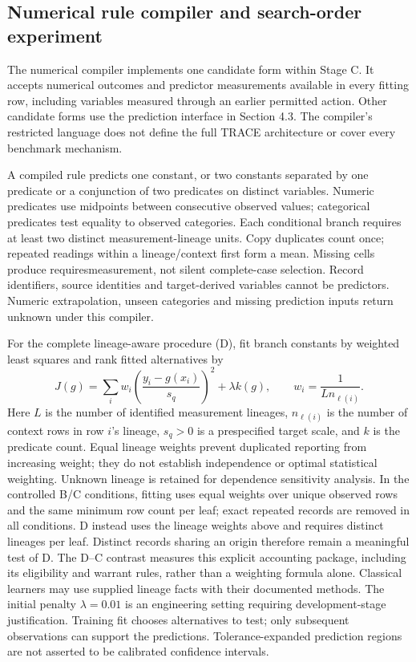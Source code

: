 \documentclass[11pt,a4paper]{article}
\newcommand{\CNSIdentifier}[1]{{\small\ttfamily\def\_{\textunderscore\allowbreak}#1}}
\begin{document}
\subsection{Numerical rule compiler and search-order
experiment}\label{numerical-rule-compiler-and-search-order-experiment}

The numerical compiler implements one candidate form within Stage C. It
accepts numerical outcomes and predictor measurements available in every
fitting row, including variables measured through an earlier permitted
action. Other candidate forms use the prediction interface in Section
4.3. The compiler's restricted language does not define the full TRACE
architecture or cover every benchmark mechanism.

A compiled rule predicts one constant, or two constants separated by one
predicate or a conjunction of two predicates on distinct variables.
Numeric predicates use midpoints between consecutive observed values;
categorical predicates test equality to observed categories. Each
conditional branch requires at least two distinct measurement-lineage
units. Copy duplicates count once; repeated readings within a
lineage/context first form a mean. Missing cells produce
\CNSIdentifier{requires\_measurement}, not silent complete-case selection.
Record identifiers, source identities and target-derived variables
cannot be predictors. Numeric extrapolation, unseen categories and
missing prediction inputs return unknown under this compiler.

For the complete lineage-aware procedure (D), fit branch constants by
weighted least squares and rank fitted alternatives by \[
J(g)=\sum_i w_i\left(\frac{y_i-g(x_i)}{s_q}\right)^2+\lambda k(g),\qquad
w_i=\frac{1}{L n_{\ell(i)}}.
\] Here \(L\) is the number of identified measurement lineages,
\(n_{\ell(i)}\) is the number of context rows in row \(i\)'s lineage,
\(s_q>0\) is a prespecified target scale, and \(k\) is the predicate
count. Equal lineage weights prevent duplicated reporting from
increasing weight; they do not establish independence or optimal
statistical weighting. Unknown lineage is retained for dependence
sensitivity analysis. In the controlled B/C conditions, fitting uses
equal weights over unique observed rows and the same minimum row count
per leaf; exact repeated records are removed in all conditions. D
instead uses the lineage weights above and requires distinct lineages
per leaf. Distinct records sharing an origin therefore remain a
meaningful test of D. The D--C contrast measures this explicit
accounting package, including its eligibility and warrant rules, rather
than a weighting formula alone. Classical learners may use supplied
lineage facts with their documented methods. The initial penalty
\(\lambda=0.01\) is an engineering setting requiring development-stage
justification. Training fit chooses alternatives to test; only
subsequent observations can support the predictions. Tolerance-expanded
prediction regions are not asserted to be calibrated confidence
intervals.
\end{document}
